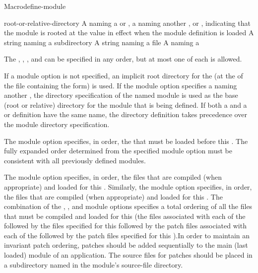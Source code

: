 \documentclass[10pt,twoside,english,pdftex]{article}
\begin{document}
\begin{functiondoc}{Macro}{define-module}{\superstar}
\fnterms
\begin{args}{root-or-relative-directory}
 A  naming a  or
  , a  naming another ,
  or \nil{}, indicating that the module is rooted at the
   value in effect when the module definition is
  loaded
\arg[subdirectory] A string naming a subdirectory
 A string naming a file
 A  naming a 
\end{args}

\fndescription The  ,
, , and  can be specified
in any order, but at most one of each is allowed.

If a  module option is not specified, an implicit root
directory for the  (at the  of the
file containing the  form) is used.  If the
 module option specifies a  naming
another , the directory specification of the named module is
used as the base (root or relative) directory for the module that is being
defined.  If both a  and a  or
 definition have the same name, the directory
definition takes precedence over the module directory specification.

The  module option specifies, in order, the 
that must be loaded before this .  The fully expanded
 order determined from the specified
 module option must be consistent with all previously
defined modules.

The  module option specifies, in order, the files that are
compiled (when appropriate) and loaded for this .  Similarly,
the  module option specifies, in order, the
 files that are compiled (when appropriate) and loaded for this
.  The combination of the ,
, and  module options specifies a total
ordering of all the files that must be compiled and loaded for this
 (the files associated with each of the 
followed by the files specified for this  followed by the patch
files associated with each of the  followed by the
patch files specified for this ).In order to maintain an
invariant patch ordering, patches should be added sequentially to the main
(last loaded) module of an application. The source files for patches should be
placed in a subdirectory named  in the module's
source-file directory.


\end{functiondoc}
\end{document}
